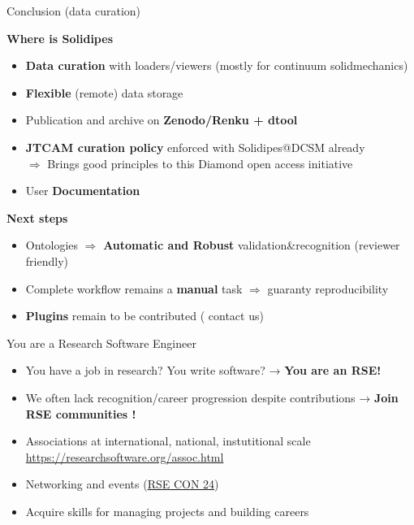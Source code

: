 \documentclass[10pt,compress,serif,aspectratio=169]{beamer}
\begin{document}
\begin{frame}[t]{Conclusion (data curation)}

  \textbf{Where is Solidipes}  
  \begin{itemize}
  \item \textbf{Data curation} with loaders/viewers (mostly for continuum solidmechanics)
    \pause
  \item \textbf{Flexible} (remote) data storage
    \pause
  \item Publication and archive on \textbf{Zenodo/Renku + {\color{red} dtool}}
    \pause
  \item \textbf{JTCAM curation policy} enforced with Solidipes@DCSM already\\\pause
  $\Rightarrow$ Brings good principles to this Diamond open access initiative
  \item User \textbf{Documentation}
  \end{itemize}
  \pause
  \vfill
  \textbf{Next steps}
  \begin{itemize}
    \item Ontologies $\Rightarrow$ \textbf{Automatic and Robust} validation\&recognition (reviewer friendly)
    \item Complete workflow remains a \textbf{manual} task $\Rightarrow$ guaranty reproducibility
    \item \textbf{Plugins} remain to be contributed ({\color{red} contact us})
  \end{itemize}
\vfill
\end{frame}


\begin{frame}[t]{You are a Research Software Engineer}
\large
  \begin{itemize}
\item You have a job in research? You write software? → \textbf{You are an RSE!}
\item We often lack recognition/career progression despite contributions\newline 
\vfill
→ \textbf{Join RSE communities !}
\vfill
\item Associations at international, national, instutitional scale
\url{https://researchsoftware.org/assoc.html}
\item Networking and events (\href{https://rsecon24.society-rse.org/}{RSE CON 24})
\item Acquire skills for managing projects and building careers
\end{itemize}
\end{frame}

\end{document}
